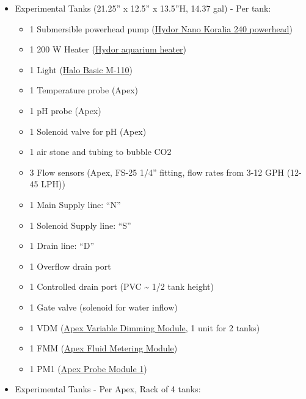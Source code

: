 \documentclass[
]{book}
\providecommand{\tightlist}{%
  \setlength{\itemsep}{0pt}\setlength{\parskip}{0pt}}
\begin{document}
\begin{itemize}
\tightlist
\item
  Experimental Tanks (21.25'' x 12.5'' x 13.5''H, 14.37 gal) - Per tank:

  \begin{itemize}
  \tightlist
  \item
    1 Submersible powerhead pump (\href{https://github.com/SilbigerLab/Mesocosm_User_Manual/blob/master/Manuals/Hydor_Nano_Pump.pdf}{Hydor Nano Koralia 240 powerhead})\\
  \item
    1 200 W Heater (\href{https://github.com/SilbigerLab/Mesocosm_User_Manual/blob/master/Manuals/Hydor_Heater.pdf}{Hydor aquarium heater})\\
  \item
    1 Light (\href{https://github.com/SilbigerLab/Mesocosm_User_Manual/blob/master/Manuals/Apex_Halo.pdf}{Halo Basic M-110})\\
  \item
    1 Temperature probe (Apex)\\
  \item
    1 pH probe (Apex)\\
  \item
    1 Solenoid valve for pH (Apex)\\
  \item
    1 air stone and tubing to bubble CO2\\
  \item
    3 Flow sensors (Apex, FS-25 1/4'' fitting, flow rates from 3-12 GPH (12-45 LPH))\\
  \item
    1 Main Supply line: ``N''\\
  \item
    1 Solenoid Supply line: ``S''\\
  \item
    1 Drain line: ``D''\\
  \item
    1 Overflow drain port\\
  \item
    1 Controlled drain port (PVC \textasciitilde{} 1/2 tank height)\\
  \item
    1 Gate valve (solenoid for water inflow)\\
  \item
    1 VDM (\href{https://github.com/SilbigerLab/Mesocosm_User_Manual/blob/master/Manuals/VDM_manual.pdf}{Apex Variable Dimming Module}, 1 unit for 2 tanks)\\
  \item
    1 FMM (\href{https://www.neptunesystems.com/getstarted/fmk/}{Apex Fluid Metering Module})\\
  \item
    1 PM1 (\href{https://github.com/SilbigerLab/Mesocosm_User_Manual/blob/master/Manuals/PM1_manual.pdf}{Apex Probe Module 1})\\
  \end{itemize}
\item
  Experimental Tanks - Per Apex, Rack of 4 tanks:


\end{itemize}
\end{document}
